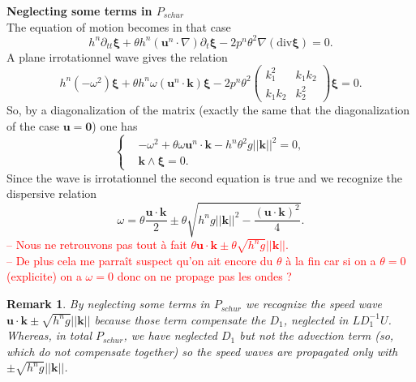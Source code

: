 \documentclass[a4paper, 11pt]{article}
\newtheorem{Remark}{Remark}
\begin{document}
\textbf{Neglecting some terms in $P_{schur}$}\\
The equation of motion becomes in that case
\begin{equation*}
h^n\partial_{tt}\boldsymbol{\xi}+\theta h^n\left(\boldsymbol{u}^n\cdot \nabla \right)\partial_t\boldsymbol{\xi}-2p^n\theta^2\nabla(\text{div}\boldsymbol{\xi})=0.
\end{equation*}
A plane irrotationnel wave gives the relation
\begin{equation*}
h^n(-\omega^2)\boldsymbol{\xi}+\theta h^n\omega (\boldsymbol{u}^n\cdot \boldsymbol{k})\boldsymbol{\xi}-2p^n\theta^2\begin{pmatrix}k_1^2&k_1k_2\\
k_1k_2&k_2^2\end{pmatrix}\boldsymbol{\xi}=0.
\end{equation*}
So, by a diagonalization of the matrix (exactly the same that the diagonalization of the case $\boldsymbol{u}=\boldsymbol{0}$) one has
\begin{equation*}
\left\{
\begin{split}
&-\omega^2+\theta \omega \boldsymbol{u}^n\cdot \boldsymbol{k}-h^n\theta^2g||\boldsymbol{k}||^2=0,\\
&\boldsymbol{k}\wedge\boldsymbol{\xi}=0.
\end{split}
\right.
\end{equation*}
Since the wave is irrotationnel the second equation is true and we recognize the dispersive relation
\begin{equation*}
\omega =\theta\frac{\boldsymbol{u}\cdot \boldsymbol{k}}{2}\pm\theta\sqrt{h^ng||\boldsymbol{k}||^2-\frac{(\boldsymbol{u}\cdot \boldsymbol{k})^2}{4}}.
\end{equation*}
\textcolor{red}{-- Nous ne retrouvons pas tout \`a fait $\theta\boldsymbol{u}\cdot \boldsymbol{k}\pm\theta\sqrt{h^ng}||\boldsymbol{k}||$. \\
-- De plus cela me parra\^it suspect qu'on ait encore du $\theta$ \`a la fin car si on a $\theta=0$ (explicite) on a $\omega =0$ donc on ne propage pas les ondes ?}
\begin{Remark}
By neglecting some terms in $P_{schur}$ we recognize the speed wave $\boldsymbol{u}\cdot \boldsymbol{k}\pm\sqrt{h^ng}||\boldsymbol{k}||$ because those term compensate the $D_1$, neglected in $LD_1^{-1}U$. Whereas, in total $P_{schur}$, we have neglected $D_1$ but not the advection term (so, which do not compensate together) so the speed waves are propagated only with $\pm\sqrt{h^ng}||\boldsymbol{k}||$.
\end{Remark}
\end{document}

